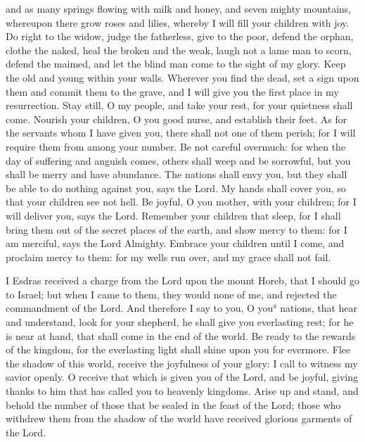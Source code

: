 {and as many springs flowing with milk and honey, and seven mighty mountains, whereupon there grow roses and lilies, whereby I will fill your children with joy.
Do right to the widow, judge the fatherless, give to the poor, defend the orphan, clothe the naked,
heal the broken and the weak, laugh not a lame man to scorn, defend the maimed, and let the blind man come to the sight of my glory.
Keep the old and young within your walls.
Wherever you find the dead, set a sign upon them and commit them to the grave, and I will give you the first place in my resurrection.
Stay still, O my people, and take your rest, for your quietness shall come.
Nourish your children, O you good nurse, and establish their feet.
As for the servants whom I have given you, there shall not one of them perish; for I will require them from among your number.
Be not careful overmuch: for when the day of suffering and anguish comes, others shall weep and be sorrowful, but you shall be merry and have abundance.
The nations shall envy you, but they shall be able to do nothing against you, says the Lord.
My hands shall cover you, so that your children see not
 hell.
Be joyful, O you mother, with your children; for I will deliver you, says the Lord.
Remember your children that sleep, for I shall bring them out of the secret places of the earth, and show mercy to them: for I am merciful, says the Lord Almighty.
Embrace your children until I come, and proclaim mercy to them: for my wells run over, and my grace shall not fail.
\par }{\PP {}I Esdras received a charge from the Lord upon the mount Horeb, that I should go to Israel; but when I came to them, they would none of me, and rejected the commandment of the Lord.
And therefore I say to you, O you° nations, that hear and understand, look for your shepherd, he shall give you everlasting rest; for he is near at hand, that shall come in the end of the world.
Be ready to the rewards of the kingdom, for the everlasting light shall shine upon you for evermore.
Flee the shadow of this world, receive the joyfulness of your glory: I call to witness my savior openly.
O receive that which is given you of the Lord, and be joyful, giving thanks to him that has called you to heavenly kingdoms.
Arise up and stand, and behold the number of those that be sealed in the feast of the Lord;
those who withdrew them from the shadow of the world have received glorious garments of the Lord.
}
